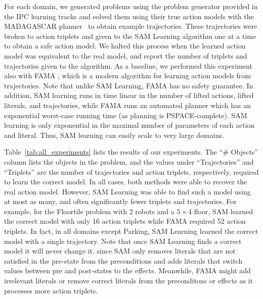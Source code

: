 \documentclass{article}
\begin{document}
For each domain, we generated problems using the problem generator provided in the IPC learning tracks 
and solved them using their true action models with the MADAGASCAR planner~\cite{Rintanen2014MadagascarS} to obtain example trajectories.
These trajectories were broken to action triplets and given to the SAM Learning algorithm one at a time to obtain a safe action model. We halted this process when the learned action model was equivalent to the real model, and report the number of triplets and trajectories given to the algorithm. 
As a baseline, we performed this experiment also with FAMA \cite{aineto19}, which is a modern algorithm for learning action models from trajectories. Note that unlike SAM Learning, FAMA has no safety guarantee. 
In addition, SAM learning runs in time linear in the number of lifted actions, lifted literals, and trajectories, while FAMA runs an automated planner which has an exponential worst-case running time (as planning is PSPACE-complete). SAM learning is only exponential in the maximal number of parameters of each action and literal. Thus, SAM learning can easily scale to very large domains. 



Table~\ref{tab:all_experiments} lists the results of our experiments. The ``\# Objects'' column lists the objects in the problem, and the values under ``Trajectories'' and ``Triplets'' are the number of trajectories and action triplets, respectively, required to learn the correct model. 
In all cases, both methods were able to recover the real action model. 
However, SAM Learning was able to find such a model using at most as many, and often significantly fewer triplets and trajectories. 
For example, for the Floortile problem with 2 robots and a $5\times 4$ floor, SAM learned the correct model with only 16 action triplets while FAMA required 52 action triplets. In fact, in all domains except Parking, SAM Learning learned the correct model with a single trajectory.  
Note that once SAM Learning finds a correct model it will never change it,  since SAM only removes literals that are not satisfied in the pre-state from the preconditions and adds literals that switch values between pre and post-states to the effects. Meanwhile, FAMA might add irrelevant literals or remove correct literals from the preconditons or effects as it processes more action triplets. 

\end{document}
